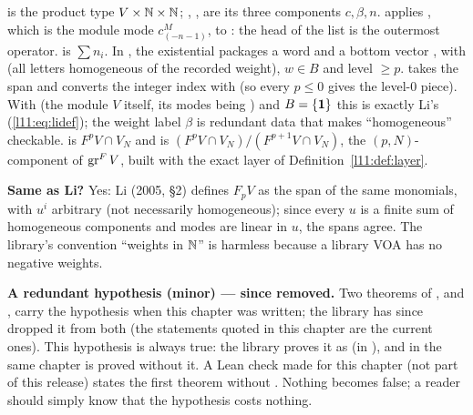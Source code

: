 \begin{dictionary}
 is the product type $V\times{\mathbb{N}}\times{\mathbb{N}}$; , ,  are its
three components $c,\beta,n$.  applies \allowbreak{}\allowbreak{}\allowbreak{}\allowbreak{},
which is the module mode $c^M_{(-n-1)}$, to : the head of the list is the outermost
operator.  is $\sum n_i$. In , the existential packages a word 
and a bottom vector , with  (all letters homogeneous of the recorded weight), $w\in
B$ and level $\ge p$.  takes the span and converts the integer index with  (so
every $p\le0$ gives the level-$0$ piece). With  (the module $V$ itself, its
modes being ) and $B = \{\mathbf{1}\}$ this is exactly Li's (\ref{l11:eq:lidef}); the
weight label $\beta$ is redundant data that makes ``homogeneous'' checkable.  is
$F^pV\cap V_N$ and  is $(F^pV\cap V_N)/(F^{p+1}V\cap V_N)$, the
$(p,N)$-component of $\operatorname{gr}^FV$, built with the exact layer of Definition~\ref{l11:def:layer}.

\textbf{Same as Li?} Yes: Li (2005, §2) defines $F_pV$ as the span of the same
monomials, with $u^i$ arbitrary (not necessarily homogeneous); since every $u$ is a finite sum of
homogeneous components and modes are linear in $u$, the spans agree. The library's convention ``weights
in ${\mathbb{N}}$'' is harmless because a library VOA has no negative weights.
\end{dictionary}

\begin{warning}
\textbf{A redundant hypothesis (minor) --- since removed.} Two theorems of
,
\allowbreak{}\allowbreak{}\allowbreak{} and \allowbreak{}\allowbreak{}\allowbreak{}\allowbreak{}, carry the
hypothesis  when this chapter was written; the library
has since dropped it from both (the statements quoted in this chapter are the current ones). This hypothesis is always
true: the library proves it as  (in
), and in the same chapter
\allowbreak{}\allowbreak{}\allowbreak{} is proved without it. A Lean check made for this chapter (not part of this release)
states the first theorem without . Nothing
becomes false; a reader should simply know that the hypothesis costs nothing.
\end{warning}

